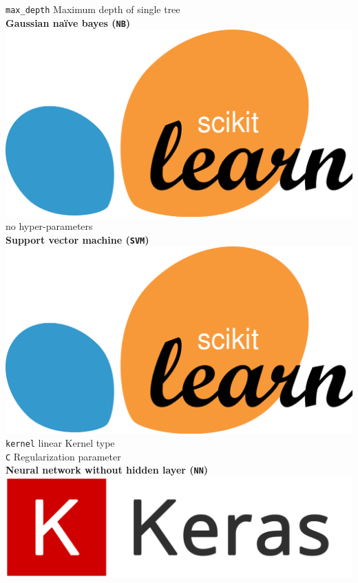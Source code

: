 \begin{tabbing}
		\>	\texttt{max\_depth}							\>	Maximum depth of single tree		\\[4mm]
	 \textbf{Gaussian na\"{i}ve bayes (\texttt{NB})} 
		\>	\>	\> 	\includegraphics[scale=0.02]{images/sklearn}									\\[3mm]
		\> 	no hyper-parameters 	\>							\>									\\[4mm]
	 \textbf{Support vector machine (\texttt{SVM})}
		\>	\>	\> 	\includegraphics[scale=0.02]{images/sklearn}									\\[3mm]
		\>	\texttt{kernel}		\>	linear					\>	Kernel type						\\[3mm]
		\>	\texttt{C}									\>	Regularization parameter	\\[4mm]
	 \textbf{Neural network without hidden layer (\texttt{NN})}
		\>	\>	\> 	\includegraphics[scale=0.025]{images/keras}									\\[3mm]

\end{tabbing}
